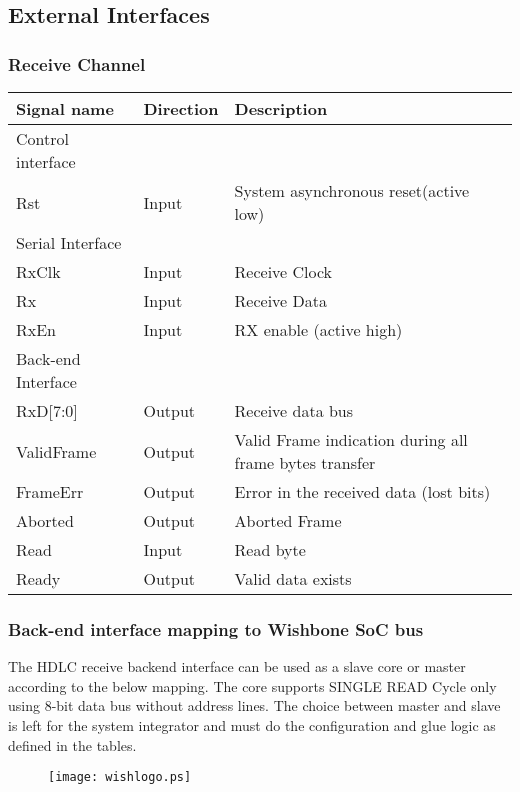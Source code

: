 \documentclass[a4paper,11pt]{article}
\begin{document}
\subsection{External Interfaces}

\subsubsection{Receive Channel}

\begin{tabular}{|l|l|l|}
\hline
Signal name& Direction& Description\\
\hline
\hline
Control interface & & \\
\hline
\hline
Rst & Input & System asynchronous reset(active low)\\
\hline
\hline
Serial Interface & & \\
\hline
\hline
RxClk & Input & Receive Clock\\
Rx & Input& Receive Data\\
RxEn & Input & RX enable (active high)\\
\hline
\hline
Back-end Interface & &\\
\hline
\hline
RxD[7:0]& Output& Receive data bus\\
ValidFrame& Output& Valid Frame indication during all frame bytes transfer\\
FrameErr& Output& Error in the received data (lost bits)\\
Aborted& Output& Aborted Frame\\
Read& Input& Read byte\\
Ready& Output& Valid data exists\\
\hline
\end{tabular}

\subsubsection{Back-end interface mapping to Wishbone SoC bus}
The HDLC receive backend interface can be used as a slave core or master according to the below mapping. The core supports SINGLE READ Cycle only using 8-bit data bus without address lines. The choice between master and slave is left for the system integrator and must do the configuration and glue logic as defined in the tables.  

\begin{figure}[!h]
\texttt{[image: wishlogo.ps]}
\label{Logo}
\end{figure}
\end{document}
